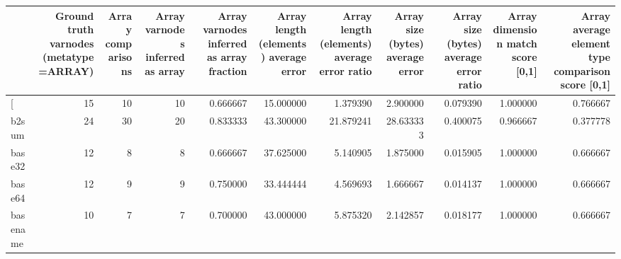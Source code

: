 \begin{tabular}{lrrrrrrrrrr}
\toprule
{} &  Ground truth varnodes (metatype=ARRAY) &  Array comparisons &  Array varnodes inferred as array &  Array varnodes inferred as array fraction &  Array length (elements) average error &  Array length (elements) average error ratio &  Array size (bytes) average error &  Array size (bytes) average error ratio &  Array dimension match score [0,1] &  Array average element type comparison score [0,1] \\
\midrule
[         &                                      15 &                 10 &                                10 &                                   0.666667 &                              15.000000 &                                     1.379390 &                          2.900000 &                                0.079390 &                           1.000000 &                                           0.766667 \\
b2sum     &                                      24 &                 30 &                                20 &                                   0.833333 &                              43.300000 &                                    21.879241 &                         28.633333 &                                0.400075 &                           0.966667 &                                           0.377778 \\
base32    &                                      12 &                  8 &                                 8 &                                   0.666667 &                              37.625000 &                                     5.140905 &                          1.875000 &                                0.015905 &                           1.000000 &                                           0.666667 \\
base64    &                                      12 &                  9 &                                 9 &                                   0.750000 &                              33.444444 &                                     4.569693 &                          1.666667 &                                0.014137 &                           1.000000 &                                           0.666667 \\
basename  &                                      10 &                  7 &                                 7 &                                   0.700000 &                              43.000000 &                                     5.875320 &                          2.142857 &                                0.018177 &                           1.000000 &                                           0.666667 \\

\end{tabular}
